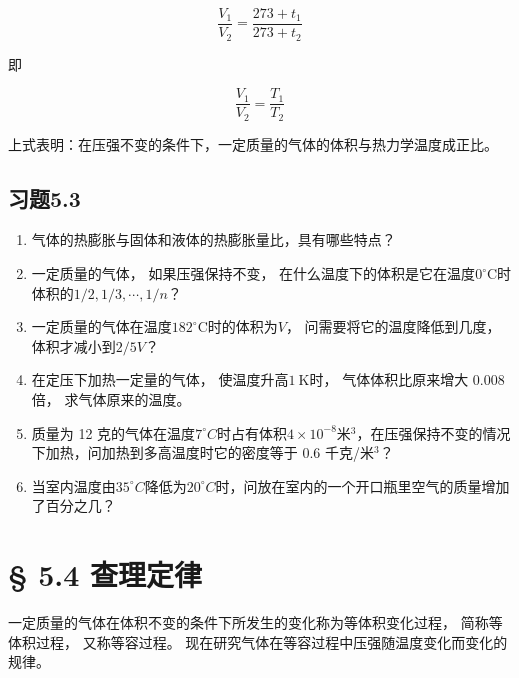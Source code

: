 \[
\frac {V _ {1}}{V _ {2}} = \frac {273 + t _ {1}}{273 + t _ {2}}
\]

即

\[
\frac {V _ {1}}{V _ {2}} = \frac {T _ {1}}{T _ {2}} \tag {5.5}
\]

上式表明：在压强不变的条件下，一定质量的气体的体积与热力学温度成正比。

\subsection{习题5.3}\label{ux4e60ux98985.3}

\begin{enumerate}
\def\labelenumi{\arabic{enumi}.}
\item
  气体的热膨胀与固体和液体的热膨胀量比，具有哪些特点？
\item
  一定质量的气体， 如果压强保持不变，
  在什么温度下的体积是它在温度\(0^{\circ} \mathrm{C}\)时体积的\(1 / 2, 1 / 3, \cdots, 1 / n\)？
\item
  一定质量的气体在温度\(182^{\circ} \mathrm{C}\)时的体积为\(V\)，
  问需要将它的温度降低到几度， 体积才减小到\(2 / 5 V\)？
\item
  在定压下加热一定量的气体， 使温度升高\(1 \mathrm{~K}\)时，
  气体体积比原来增大 0.008 倍， 求气体原来的温度。
\item
  质量为 12
  克的气体在温度\(7^{\circ}C\)时占有体积\(4 \times 10^{-8}\)米\(^{3}\)，在压强保持不变的情况下加热，问加热到多高温度时它的密度等于
  0.6 千克/米\(^{3}\)？
\item
  当室内温度由\(35^{\circ}C\)降低为\(20^{\circ}C\)时，问放在室内的一个开口瓶里空气的质量增加了百分之几？
\end{enumerate}

\section{§ 5.4 查理定律}\label{ux67e5ux7406ux5b9aux5f8b}

一定质量的气体在体积不变的条件下所发生的变化称为等体积变化过程，
简称等体积过程， 又称等容过程。
现在研究气体在等容过程中压强随温度变化而变化的规律。

